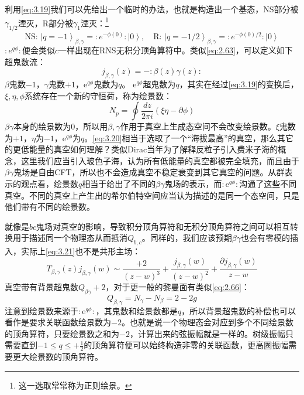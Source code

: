 利用\ref{eq:3.19}我们可以先给出一个临时的办法，也就是构造出一个基态，NS部分被$\gamma_{1/2}$湮灭，R部分被$\gamma_1$湮灭：\footnote{这一选取常常称为正则绘景。}
\begin{equation}
	\label{eq:3.20}
	\text{NS: }\left|q=-1\right\rangle_{\beta,\gamma}=:e^{-\phi(0)}:\left|0\right\rangle,\quad \text{R: }\left|q=-1/2\right\rangle_{\beta,\gamma}=:e^{-\phi(0)/2}:\left|0\right\rangle
\end{equation}
$:e^{q\phi}:$便会类似$c$一样出现在RNS无积分顶角算符中。类似\ref{eq:2.63}，可以定义如下超鬼数流：
\begin{equation}
	\label{eq:3.21}
	j_{\beta,\gamma}(z)=-:\beta(z)\gamma(z):
\end{equation}
$\beta$鬼数$-1$，$\gamma$鬼数$+1$，$\mathrm{e}^{q\phi}$鬼数为$q$。
$\mathrm{e}^{q\phi}$超鬼数为$q$，其实在经过\ref{eq:3.19}的变换后，$\xi,\eta,\phi$系统存在一个新的守恒荷，称为绘景数：
\begin{equation}
	N_p=\oint\frac{dz}{2\pi i}(\xi\eta-\partial\phi)
\end{equation}
$\beta\gamma$本身的绘景数为$0$，所以用$\beta,\gamma$作用于真空上生成态空间不会改变绘景数。$\xi$鬼数为$+1$，$\eta$为$-1$，$\mathrm{e}^{q\phi}$为$q$。\ref{eq:3.20}相当于选取了一个“海拔最高”的真空，那么其它的更低能量的真空如何理解？类似Dirac当年为了解释反粒子引入费米子海的概念，这里我们应当引入玻色子海，认为所有低能量的真空都被完全填充，而且由于$\beta\gamma$鬼场是自由CFT，所以也不会造成真空不稳定衰变到其它真空的问题。从群表示的观点看，绘景数$q$相当于给出了不同的$\beta\gamma$鬼场的表示，而$:\mathrm{e}^{q\phi}:$沟通了这些不同真空。不同的真空上产生出的希尔伯特空间应当认为描述的是同一个态空间，只是他们带有不同的绘景数。

就像是$bc$鬼场对真空的影响，导致积分顶角算符和无积分顶角算符之间可以相互转换用于描述同一个物理态从而抵消$Q_{b,c}$。同样的，我们应该预期$\beta\gamma$也会有零模的插入，实际上\ref{eq:3.21}也不是共形主场：
\begin{equation}
	T_{\beta,\gamma}(z)j_{\beta,\gamma}(w)\sim\frac{+2}{(z-w)^3}+\frac{j_{\beta,\gamma}(w)}{(z-w)^2}+\frac{\partial j_{\beta,\gamma}(w)}{z-w}
\end{equation}
真空带有背景超鬼数$Q_{\beta\gamma}+2$，对于更一般的黎曼面有类似\ref{eq:2.66}：
\begin{equation}
	Q_{\beta,\gamma} = N_{\gamma}-N_{\beta}=2-2g
\end{equation}
注意到绘景数来源于$:\mathrm{e}^{q\phi}:$，其鬼数和绘景数都是$q$，所以背景超鬼数的补偿也可以看作是要求关联函数绘景数为$-2$。也就是说一个物理态会对应到多个不同绘景数的顶角算符，只要绘景数之和为$-2$，计算出来的弦振幅就是一样的。树级振幅只需要直到$-1\leq q\leq+\frac{1}{2}$的顶角算符便可以始终构造非零的关联函数，更高圈振幅需要更大绘景数的顶角算符。
